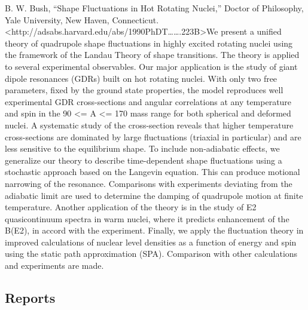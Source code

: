 \documentclass[]{article}
\begin{document}
B. W. Bush, ``Shape Fluctuations in Hot Rotating Nuclei,'' Doctor of
Philosophy, Yale University, New Haven, Connecticut.
\textless{}http://adsabs.harvard.edu/abs/1990PhDT\ldots{}\ldots{}.223B\textgreater{}We
present a unified theory of quadrupole shape fluctuations in highly
excited rotating nuclei using the framework of the Landau Theory of
shape transitions. The theory is applied to several experimental
observables. Our major application is the study of giant dipole
resonances (GDRs) built on hot rotating nuclei. With only two free
parameters, fixed by the ground state properties, the model reproduces
well experimental GDR cross-sections and angular correlations at any
temperature and spin in the 90 \textless{}= A \textless{}= 170 mass
range for both spherical and deformed nuclei. A systematic study of the
cross-section reveals that higher temperature cross-sections are
dominated by large fluctuations (triaxial in particular) and are less
sensitive to the equilibrium shape. To include non-adiabatic effects, we
generalize our theory to describe time-dependent shape fluctuations
using a stochastic approach based on the Langevin equation. This can
produce motional narrowing of the resonance. Comparisons with
experiments deviating from the adiabatic limit are used to determine the
damping of quadrupole motion at finite temperature. Another application
of the theory is in the study of E2 quasicontinuum spectra in warm
nuclei, where it predicts enhancement of the B(E2), in accord with the
experiment. Finally, we apply the fluctuation theory in improved
calculations of nuclear level densities as a function of energy and spin
using the static path approximation (SPA). Comparison with other
calculations and experiments are made.

\subsection{Reports}\label{reports}
\end{document}
